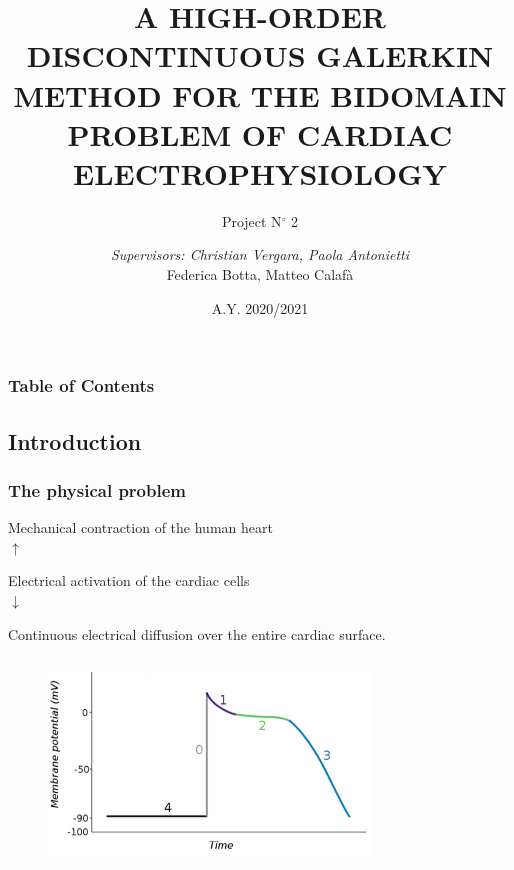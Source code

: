 \documentclass[9pt]{beamer}
\title[\color{white}{Project N°2}]{A HIGH-ORDER DISCONTINUOUS GALERKIN METHOD FOR THE BIDOMAIN PROBLEM OF CARDIAC ELECTROPHYSIOLOGY}
\subtitle{Project N$^\circ$ 2}
\author[]{\small{\textit{Supervisors: Christian Vergara, Paola Antonietti}}\\ \vspace{4mm} Federica Botta, Matteo Calafà}
\institute[Politecnico di Milano]{\scriptsize{Course of Numerical Analysis for Partial Differential Equations}}
\date{\tiny{A.Y. 2020/2021}}
\begin{document}
\frame{\titlepage}

\begin{frame}
\frametitle{Table of Contents}
\tableofcontents
\end{frame}

\begin{frame}
\section{Introduction}
\frametitle{The physical problem}
\begin{center}
Mechanical contraction of the human heart\\

$\uparrow$

Electrical activation of the cardiac cells\\

$\downarrow$

Continuous electrical diffusion over the entire cardiac surface.\\
\end{center}
\begin{columns}
            \begin{column}{0.5\textwidth}
                  \begin{figure}[t]
                  \includegraphics[width = 0.8\textwidth]{./potential_cycle.png}
                  \centering
                  \end{figure}
            \end{column}
            \begin{column}{0.5\textwidth}  
                  \centering
            \end{column}
     \end{columns}
\end{frame}
\end{document}
